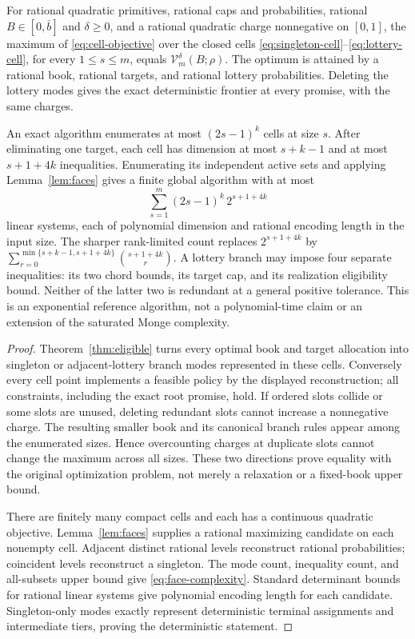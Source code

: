 \begin{theorem}\label{thm:continuous}
For rational quadratic primitives, rational caps and probabilities, rational $B\in[0,\bar b]$ and $\delta\geq0$, and a rational quadratic charge nonnegative on $[0,1]$, the maximum of \eqref{eq:cell-objective} over the closed cells \eqref{eq:singleton-cell}--\eqref{eq:lottery-cell}, for every $1\leq s\leq m$, equals $\mathcal V_m^\delta(B;\rho)$. The optimum is attained by a rational book, rational targets, and rational lottery probabilities. Deleting the lottery modes gives the exact deterministic frontier at every promise, with the same charges.

An exact algorithm enumerates at most $(2s-1)^k$ cells at size $s$. After eliminating one target, each cell has dimension at most $s+k-1$ and at most $s+1+4k$ inequalities. Enumerating its independent active sets and applying Lemma~\ref{lem:faces} gives a finite global algorithm with at most
\begin{equation}\label{eq:face-complexity}
 \sum_{s=1}^m (2s-1)^k\,2^{s+1+4k}
\end{equation}
linear systems, each of polynomial dimension and rational encoding length in the input size. The sharper rank-limited count replaces $2^{s+1+4k}$ by $\sum_{r=0}^{\min\{s+k-1,s+1+4k\}}\binom{s+1+4k}{r}$. A lottery branch may impose four separate inequalities: its two chord bounds, its target cap, and its realization eligibility bound. Neither of the latter two is redundant at a general positive tolerance. This is an exponential reference algorithm, not a polynomial-time claim or an extension of the saturated Monge complexity.
\end{theorem}
\begin{proof}
Theorem~\ref{thm:eligible} turns every optimal book and target allocation into singleton or adjacent-lottery branch modes represented in these cells. Conversely every cell point implements a feasible policy by the displayed reconstruction; all constraints, including the exact root promise, hold. If ordered slots collide or some slots are unused, deleting redundant slots cannot increase a nonnegative charge. The resulting smaller book and its canonical branch rules appear among the enumerated sizes. Hence overcounting charges at duplicate slots cannot change the maximum across all sizes. These two directions prove equality with the original optimization problem, not merely a relaxation or a fixed-book upper bound.

There are finitely many compact cells and each has a continuous quadratic objective. Lemma~\ref{lem:faces} supplies a rational maximizing candidate on each nonempty cell. Adjacent distinct rational levels reconstruct rational probabilities; coincident levels reconstruct a singleton. The mode count, inequality count, and all-subsets upper bound give \eqref{eq:face-complexity}. Standard determinant bounds for rational linear systems give polynomial encoding length for each candidate. Singleton-only modes exactly represent deterministic terminal assignments and intermediate tiers, proving the deterministic statement.
\end{proof}

